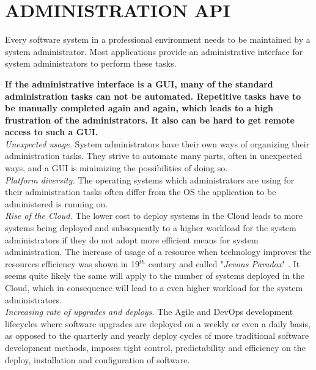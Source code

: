 \newpage
\section*{ADMINISTRATION API}
Every software system in a professional environment needs to be maintained by a system administrator. Most applications provide an administrative interface for system administrators to perform these tasks.
\begin{center}
  
\end{center}
\textbf{If the administrative interface is a GUI, many of the standard administration tasks can not be automated. Repetitive tasks have to be manually completed again and again, which leads to a high frustration of the administrators. It also can be hard to get remote access to such a GUI.}\\

\textit{Unexpected usage.} System administrators have their own ways of organizing their administration tasks. They strive to automate many parts, often in unexpected ways, and a GUI is minimizing the possibilities of doing so.\\

\textit{Platform diversity.} The operating systems which administrators are using for their administration tasks often differ from the OS the application to be administered is running on.\\

\textit{Rise of the Cloud.} The lower cost to deploy systems in the Cloud leads to more systems being deployed and subsequently to a higher workload for the system administrators if they do not adopt more efficient means for system administration. The increase of usage of a resource when technology improves the resources efficiency was shown in 19$^{th}$ century and called "\textit{Jevons Paradox}" \cite{Polimeni2008}. It seems quite likely the same will apply to the number of systems deployed in the Cloud, which in consequence will lead to a even higher workload for the system administrators.\\

\textit{Increasing rate of upgrades and deploys.} The Agile and DevOps development lifecycles where software upgrades are deployed on a weekly or even a  daily basis, as opposed to the quarterly and yearly deploy cycles of more traditional software development methods, imposes tight control, predictability and efficiency on the deploy, installation and configuration of software. \cite{Humble2010}
\begin{center}
   
\end{center}

